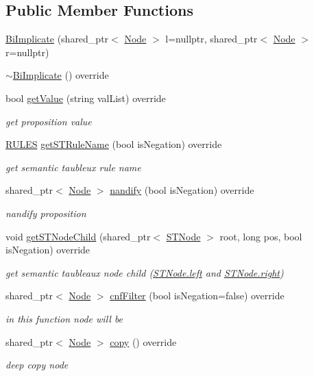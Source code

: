 \subsection*{Public Member Functions}
\begin{DoxyCompactItemize}
\item 
\hyperlink{class_bi_implicate_acd402fb9b2eef1b44361448038f20ddc}{Bi\+Implicate} (shared\+\_\+ptr$<$ \hyperlink{class_node}{Node} $>$ l=nullptr, shared\+\_\+ptr$<$ \hyperlink{class_node}{Node} $>$ r=nullptr)
\item 
\hyperlink{class_bi_implicate_ad3f12180788d7d207b2e385c2a89c35b}{$\sim$\+Bi\+Implicate} () override
\item 
bool \hyperlink{class_bi_implicate_ac7cb17f1414705f9a1d9df83793b0d58}{get\+Value} (string val\+List) override
\begin{DoxyCompactList}\small\item\em get proposition value \end{DoxyCompactList}\item 
\hyperlink{proposition_2tableaux_2enum_8h_a70c93904c6a27d228050f922eb4fc3b8}{R\+U\+L\+ES} \hyperlink{class_bi_implicate_a3ca1a9b3fd1805b56b72def494179ea3}{get\+S\+T\+Rule\+Name} (bool is\+Negation) override
\begin{DoxyCompactList}\small\item\em get semantic taubleux rule name \end{DoxyCompactList}\item 
shared\+\_\+ptr$<$ \hyperlink{class_node}{Node} $>$ \hyperlink{class_bi_implicate_aa77f25616aa7a47ae4007d661ad60518}{nandify} (bool is\+Negation) override
\begin{DoxyCompactList}\small\item\em nandify proposition \end{DoxyCompactList}\item 
void \hyperlink{class_bi_implicate_a7ecc298b799d533b4bf19b3912932fc7}{get\+S\+T\+Node\+Child} (shared\+\_\+ptr$<$ \hyperlink{class_s_t_node}{S\+T\+Node} $>$ root, long pos, bool is\+Negation) override
\begin{DoxyCompactList}\small\item\em get semantic taubleaux node child (\hyperlink{class_s_t_node_a19ba8bab4660bdeee0e897687b451a8b}{S\+T\+Node.\+left} and \hyperlink{class_s_t_node_a66d06118063fb739058f91c75b725e27}{S\+T\+Node.\+right}) \end{DoxyCompactList}\item 
shared\+\_\+ptr$<$ \hyperlink{class_node}{Node} $>$ \hyperlink{class_bi_implicate_a3f79e7340ff831b0bb927d8a70414ac3}{cnf\+Filter} (bool is\+Negation=false) override
\begin{DoxyCompactList}\small\item\em in this function node will be \end{DoxyCompactList}\item 
shared\+\_\+ptr$<$ \hyperlink{class_node}{Node} $>$ \hyperlink{class_bi_implicate_a41c9d9c53bf05cdde330ec8df07fde31}{copy} () override
\begin{DoxyCompactList}\small\item\em deep copy node \end{DoxyCompactList}\end{DoxyCompactItemize}
